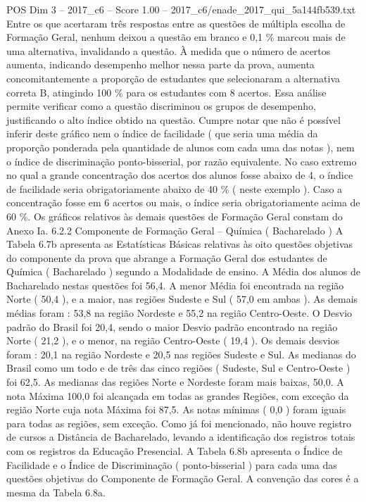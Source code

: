 \begin{textsample}{POS Dim 3 – 2017\_c6 – Score 1.00 – 2017\_c6/enade\_2017\_qui\_5a144fb539.txt}
Entre os que acertaram três respostas entre as questões de múltipla escolha de Formação Geral, nenhum deixou a questão em branco e 0,1 \% marcou mais de uma alternativa, invalidando a questão.
À medida que o número de acertos aumenta, indicando desempenho melhor nessa parte da prova, aumenta concomitantemente a proporção de estudantes que selecionaram a alternativa correta B, atingindo 100 \% para os estudantes com 8 acertos.
Essa análise permite verificar como a questão discriminou os grupos de desempenho, justificando o alto índice obtido na questão.
Cumpre notar que não é possível inferir deste gráfico nem o índice de facilidade ( que seria uma média da proporção ponderada pela quantidade de alunos com cada uma das notas ), nem o índice de discriminação ponto-bisserial, por razão equivalente.
No caso extremo no qual a grande concentração dos acertos dos alunos fosse abaixo de 4, o índice de facilidade seria obrigatoriamente abaixo de 40 \% ( neste exemplo ).
Caso a concentração fosse em 6 acertos ou mais, o índice seria obrigatoriamente acima de 60 \%.
Os gráficos relativos às demais questões de Formação Geral constam do Anexo Ia. 6.2.2 Componente de Formação Geral – Química ( Bacharelado ) A Tabela 6.7b apresenta as Estatísticas Básicas relativas às oito questões objetivas do componente da prova que abrange a Formação Geral dos estudantes de Química ( Bacharelado ) segundo a Modalidade de ensino.
A Média dos alunos de Bacharelado nestas questões foi 56,4.
A menor Média foi encontrada na região Norte ( 50,4 ), e a maior, nas regiões Sudeste e Sul ( 57,0 em ambas ).
As demais médias foram : 53,8 na região Nordeste e 55,2 na região Centro-Oeste.
O Desvio padrão do Brasil foi 20,4, sendo o maior Desvio padrão encontrado na região Norte ( 21,2 ), e o menor, na região Centro-Oeste ( 19,4 ).
Os demais desvios foram : 20,1 na região Nordeste e 20,5 nas regiões Sudeste e Sul.
As medianas do Brasil como um todo e de três das cinco regiões ( Sudeste, Sul e Centro-Oeste ) foi 62,5.
As medianas das regiões Norte e Nordeste foram mais baixas, 50,0.
A nota Máxima 100,0 foi alcançada em todas as grandes Regiões, com exceção da região Norte cuja nota Máxima foi 87,5.
As notas mínimas ( 0,0 ) foram iguais para todas as regiões, sem exceção.
Como já foi mencionado, não houve registro de cursos a Distância de Bacharelado, levando a identificação dos registros totais com os registros da Educação Presencial.
A Tabela 6.8b apresenta o Índice de Facilidade e o Índice de Discriminação ( ponto-bisserial ) para cada uma das questões objetivas do Componente de Formação Geral.
A convenção das cores é a mesma da Tabela 6.8a.

\end{textsample}
